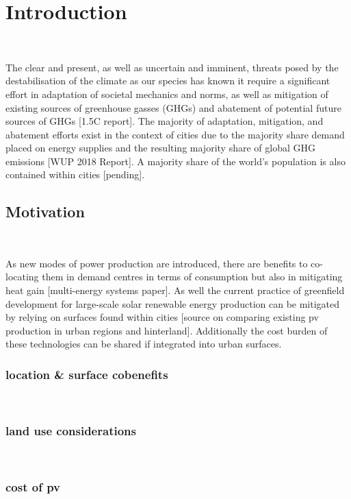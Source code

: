 
\section{Introduction}\

The clear and present, as well as uncertain and imminent, threats posed by the destabilisation of the climate as our species has known it require a significant effort in adaptation of societal mechanics and norms, as well as mitigation of existing sources of greenhouse gasses (GHGs) and abatement of potential future sources of GHGs [1.5C report]. The majority of adaptation, mitigation, and abatement efforts exist in the context of cities due to the majority share demand placed on energy supplies and the resulting majority share of global GHG emissions [WUP 2018 Report]. A majority share of the world's population is also contained within cities [pending]. 


\subsection{Motivation}\

As new modes of power production are introduced, there are benefits to co-locating them in demand centres in terms of consumption but also in mitigating heat gain [multi-energy systems paper]. As well the current practice of greenfield development for large-scale solar renewable energy production can be mitigated by relying on surfaces found within cities [source on comparing existing pv production in urban regions and hinterland]. Additionally the cost burden of these technologies can be shared if integrated into urban surfaces. 


\subsubsection{location \& surface cobenefits}\

\vspace{2cm}


\subsubsection{land use considerations}\

\vspace{2cm}


\subsubsection{cost of pv}\

